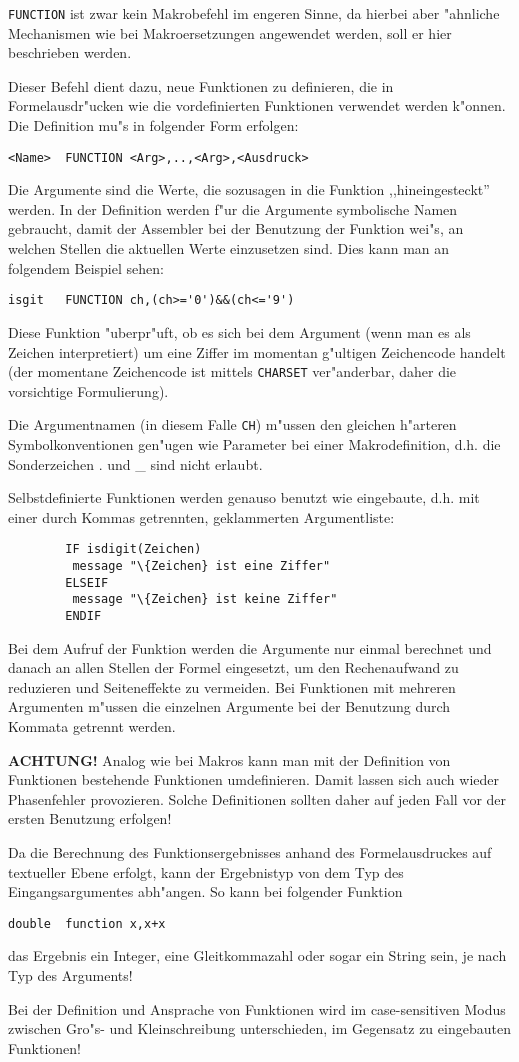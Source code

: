 \documentclass[12pt,a4paper,twoside]{report}
\newcommand{\bb}[1]{{\bf #1}}
\newcommand{\tty}[1]{{\tt #1}}
\begin{document}
\tty{FUNCTION} ist zwar kein Makrobefehl im engeren Sinne, da
hierbei aber "ahnliche Mechanismen wie bei Makroersetzungen
angewendet werden, soll er hier beschrieben werden.
\par
Dieser Befehl dient dazu, neue Funktionen zu definieren, die in
Formel\-ausdr"ucken wie die vordefinierten Funktionen verwendet werden
k"onnen.  Die Definition mu"s in folgender Form erfolgen:
\begin{verbatim}
<Name>  FUNCTION <Arg>,..,<Arg>,<Ausdruck>
\end{verbatim}
Die Argumente sind die Werte, die sozusagen in die Funktion
,,hineingesteckt'' werden.  In der Definition werden f"ur die Argumente
symbolische Namen gebraucht, damit der Assembler bei der Benutzung
der Funktion wei"s, an welchen Stellen die aktuellen Werte einzusetzen
sind. Dies kann man an folgendem Beispiel sehen:
\begin{verbatim}
isgit   FUNCTION ch,(ch>='0')&&(ch<='9')
\end{verbatim}
Diese Funktion "uberpr"uft, ob es sich bei dem Argument (wenn man es
als Zeichen interpretiert) um eine Ziffer im momentan g"ultigen
Zeichencode handelt (der momentane Zeichencode ist mittels \tty{CHARSET}
ver"anderbar, daher die vorsichtige Formulierung).
\par
Die Argumentnamen (in diesem Falle \tty{CH}) m"ussen den gleichen h"arteren
Symbolkonventionen gen"ugen wie Parameter bei einer Makrodefinition,
d.h. die Sonderzeichen . und \_ sind nicht erlaubt.
\par
Selbstdefinierte Funktionen werden genauso benutzt wie eingebaute,
d.h. mit einer durch Kommas getrennten, geklammerten Argumentliste:
\begin{verbatim}
        IF isdigit(Zeichen)
         message "\{Zeichen} ist eine Ziffer"
        ELSEIF
         message "\{Zeichen} ist keine Ziffer"
        ENDIF
\end{verbatim}
\par
Bei dem Aufruf der Funktion werden die Argumente nur einmal berechnet
und danach an allen Stellen der Formel eingesetzt, um den
Rechenaufwand zu reduzieren und Seiteneffekte zu vermeiden.
Bei Funktionen mit mehreren Argumenten m"ussen die einzelnen Argumente
bei der Benutzung durch Kommata getrennt werden.
\par
\bb{ACHTUNG!} Analog wie bei Makros kann man mit der Definition von
Funktionen bestehende Funktionen umdefinieren.  Damit lassen sich auch
wieder Phasenfehler provozieren.  Solche Definitionen sollten daher auf
jeden Fall vor der ersten Benutzung erfolgen!
\par
Da die Berechnung des Funktionsergebnisses anhand des Formelausdruckes
auf textueller Ebene erfolgt, kann der Ergebnistyp von dem Typ des
Eingangsargumentes abh"angen.  So kann bei folgender Funktion
\begin{verbatim}
double  function x,x+x
\end{verbatim}
das Ergebnis ein Integer, eine Gleitkommazahl oder sogar ein String
sein, je nach Typ des Arguments!
\par
Bei der Definition und Ansprache von Funktionen wird im case-sensitiven
Modus zwischen Gro"s- und Kleinschreibung unterschieden, im Gegensatz
zu eingebauten Funktionen!
\end{document}
